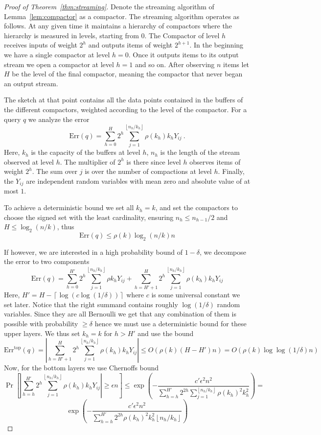 \documentclass[anon,12pt]{colt2019} %
\newcommand{\eps}{\epsilon}
\newcommand{\floor}[1]{\left \lfloor #1 \right \rfloor}
\newcommand{\ceil}[1]{\left \lceil #1 \right \rceil}
\begin{document}
\begin{proof} [Proof of Theorem~\ref{thm:streaming}]
Denote the streaming algorithm of Lemma~\ref{lem:compactor} as a compactor. The streaming algorithm operates as follows. At any given time it maintains a hierarchy of compactors where the hierarchy is measured in levels, starting from 0. The Compactor of level $h$ receives inputs of weight $2^h$ and outputs items of weight $2^{h+1}$. In the beginning we have a single compactor at level $h=0$. Once it outputs items to its output stream we open a compactor at level $h=1$ and so on. After observing $n$ items let $H$ be the level of the final compactor, meaning the compactor that never began an output stream.

The sketch at that point contains all the data points contained in the buffers of the different compactors, weighted according to the level of the compactor. For a query $q$ we analyze the error
$$\text{Err}(q) = \sum_{h=0}^H 2^h \sum_{j=1}^{\floor{n_h/k_h} } \rho(k_h) k_h Y_{ij} \ .$$
Here, $k_h$ is the capacity of the buffers at level $h$, $n_h$ is the length of the stream observed at level $h$. The multiplier of $2^h$ is there since level $h$ observes items of weight $2^h$. The sum over $j$ is over the number of compactions at level $h$. Finally, the $Y_{ij}$ are independent random variables with mean zero and absolute value of at most $1$. 

To achieve a deterministic bound we set all $k_h=k$, and set the compactors to choose the signed set with the least cardinality, ensuring $n_h \leq n_{h-1}/2$ and $H \leq \log_2(n/k)$, thus
$$ \text{Err}(q) \leq \rho(k) \log_2(n/k) n $$

If however, we are interested in a high probability bound of $1-\delta$, we decompose the error to two components
$$\text{Err}(q) = \sum_{h=0}^{H'} 2^h \sum_{j=1}^{\floor{n_h/k_h} } \rho k_h Y_{ij} + \sum_{h=H'+1}^H 2^h \sum_{j=1}^{\floor{n_h/k_h} } \rho(k_h) k_h Y_{ij}$$
 Here, $H' = H - \ceil{\log(c \log(1/ \delta))}$ where $c$ is some universal constant we set later. Notice that the right summand contains roughly $\log(1/\delta)$ random variables. Since they are all Bernoulli we get that any combination of them is possible with probability $\geq \delta$ hence we must use a deterministic bound for these upper layers. We thus set $k_h=k$ for $h > H'$ and use the bound
$$ \text{Err}^{\text{top}}(q) = \left|\sum_{h=H'+1}^H 2^h \sum_{j=1}^{\floor{n_h/k_h} } \rho(k_h) k_h Y_{ij}\right| \leq O\left( \rho(k) \left(H-H'\right) n \right) =  O\left( \rho(k) \log \log(1/ \delta) n \right) $$
Now, for the bottom layers we use Chernoffs bound
$$ \Pr\left[   \left|\sum_{h=h}^{H'} 2^h \sum_{j=1}^{\floor{n_h/k_h} } \rho(k_h) k_h Y_{ij} \right| \geq \eps n \right] \leq \exp \left( -\frac{c' \eps^2 n^2}{\sum_{h=h}^{H'} 2^{2h} \sum_{j=1}^{\floor{n_h/k_h} } \rho(k_h)^2 k_h^2}   \right) =$$
$$\exp \left( -\frac{c' \eps^2 n^2}{\sum_{h=h}^{H'} 2^{2h} \rho(k_h)^2 k_h^2 \floor{n_h/k_h} } \right) $$


\end{proof}
\end{document}
